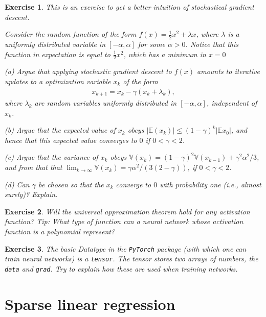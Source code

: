 \documentclass{article}
\newcommand{\erw}{\mathbb{E}} %
\newtheorem{exercise}{Exercise}
\newcommand{\abs}[1]{\vert #1 \vert}
\begin{document}
\begin{exercise}
    This is an exercise to get a better intuition of stochastical gradient descent.

    Consider the random function of the form $f(x) = \tfrac{1}{2} x^2 + \lambda x$, where $\lambda$ is a uniformly distributed variable in $[-\alpha,\alpha]$ for some $\alpha>0$. Notice that this function in expectation is equal to $\tfrac{1}{2}x^2$, which has a minimum in $x=0$
    
    (a) Argue that applying stochastic gradient descent to $f(x)$ amounts to iterative updates to a optimization variable $x_k$ of the form
    \begin{align*}
        x_{k+1} = x_k - \gamma(x_k + \lambda_k),
    \end{align*}
    where $\lambda_k$ are random variables uniformly distributed in $[-\alpha,\alpha]$, independent of $x_k$.

    (b) Argue that the expected value of $x_{k}$ obeys $\abs{\mathbb{E}(x_k)} \leq (1-\gamma)^k \abs{\erw{x_0}}$, and hence that this expected value converges to $0$ if $0<\gamma<2$.

    (c) Argue that the variance of $x_k$ obeys $\mathbb{V}(x_k) = (1-\gamma)^2 \mathbb{V}(x_{k-1}) +\gamma^2 \alpha^2/3 $, and from that that $\lim_{k \to \infty}\mathbb{V}(x_k) = \gamma\alpha^2/(3(2-\gamma))$, if $0<\gamma<2$. 

    (d) Can $\gamma$ be chosen so that the $x_k$ converge to $0$ with probability one (i.e., almost surely)? Explain.
\end{exercise}

\begin{exercise}
    Will the universal approximation theorem hold for any activation function? \emph{Tip:} What type of function can a neural network whose activation function is a polynomial represent?
\end{exercise}

\begin{exercise}
    The basic Datatype in the \texttt{PyTorch} package (with which one can train neural networks) is a \texttt{tensor}. The tensor stores two arrays of numbers, the \texttt{data} and \texttt{grad}. Try to explain how these are used when training networks.
\end{exercise}

\section{Sparse linear regression}
\end{document}
